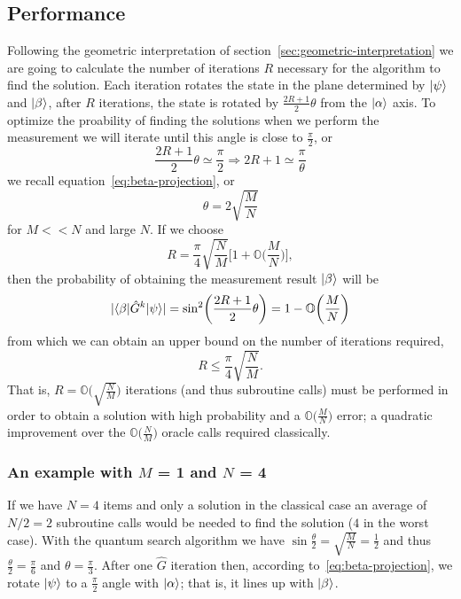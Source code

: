 \subsection{Performance}\label{sec:performance}
Following the geometric interpretation of section~\ref{sec:geometric-interpretation} we are going to calculate the number of iterations $R$ necessary for the algorithm to find the solution. Each iteration rotates the state in the plane determined by $\ket{\psi}$ and $\ket{\beta}$, after $R$ iterations, the state is rotated by $\frac{2R + 1}{2}\theta$ from the $\ket{\alpha}$ axis. To optimize the proability of finding the solutions when we perform the measurement we will iterate until this angle is close to $\frac{\pi}{2}$, or
\begin{equation*}
    \frac{2R + 1}{2}\theta \simeq \frac{\pi}{2} \Rightarrow 2R + 1 \simeq \frac{\pi}{\theta}
\end{equation*}
we recall equation~\ref{eq:beta-projection}, or
\begin{equation*}
    \theta = 2\sqrt{\frac{M}{N}}
\end{equation*}
for $M<<N$ and large $N$. If we choose
\begin{equation*}
    R = \frac{\pi}{4}\sqrt{\frac{N}{M}} \biggl[1+\mathbb{O}\biggl(\frac{M}{N}\biggr)\biggr],
\end{equation*}
then the probability of obtaining the measurement result $\ket{\beta}$ will be
\begin{equation*}
    \lvert\braket{\beta | \hat{G}^k | \psi}\rvert = \sin^2\biggl(\frac{2R + 1}{2}\theta\biggr) = 1 - \mathbb{O}\biggl(\frac{M}{N}\biggl)
\end{equation*}
from which we can obtain an upper bound on the number of iterations required,
\begin{equation}\label{eq:upper-bound}
    R \leq \frac{\pi}{4} \sqrt{\frac{N}{M}}.
\end{equation}
That is, $R = \mathbb{O}\bigl(\sqrt{\frac{N}{M}}\bigr)$ iterations (and thus subroutine calls) must be performed in order to obtain a solution with high probability and a $\mathbb{O}\bigl(\frac{M}{N}\bigr)$ error; a quadratic improvement over the $\mathbb{O}\bigl(\frac{N}{M}\bigr)$ oracle calls required classically.

\subsubsection{An example with $M$ = 1 and $N$ = 4}
If we have $N = 4$ items and only a solution in the classical case an average of $N/2 = 2$ subroutine calls would be needed to find the solution ($4$ in the worst case).
With the quantum search algorithm we have $\sin{\frac{\theta}{2}} = \sqrt{\frac{M}{N}} = \frac{1}{2}$ and thus $\frac{\theta}{2} = \frac{\pi}{6}$ and $\theta = \frac{\pi}{3}$. After one $\hat{G}$ iteration then, according to~\ref{eq:beta-projection}, we rotate $\ket{\psi}$ to a $\frac{\pi}{2}$ angle with $\ket{\alpha}$; that is, it lines up with $\ket{\beta}$.

